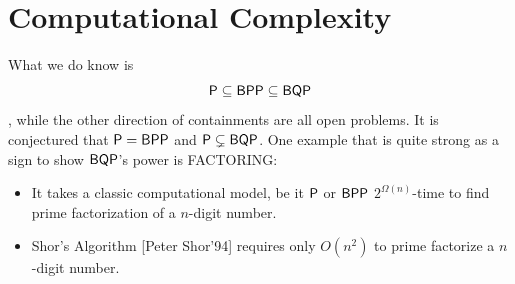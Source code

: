 \documentclass[12pt]{article}
\begin{document}
\section{Computational Complexity}
What we do know is $$
\textsf{P} \subseteq \textsf{BPP} \subseteq \textsf{BQP}
$$, while the other direction of containments are all open problems. It is conjectured that $\textsf{P}=\textsf{BPP}$ and $\textsf{P} \subsetneq \textsf{BQP}$. One example that is quite strong as a sign to show $\textsf{BQP}$'s power is FACTORING:
\begin{itemize}
    \item It takes a classic computational model, be it $\textsf{P}$ or $\textsf{BPP}$ $2^{\Omega(n)}$-time to find prime factorization of a $n$-digit number.
    \item Shor's Algorithm [Peter Shor'94] requires only $O(n^2)$ to prime factorize a $n$-digit number.
\end{itemize}
\end{document}
